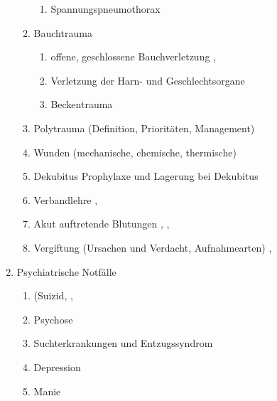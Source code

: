 \begin{WidePar}
\begin{multicols}{2}
\begin{enumerate}
\begin{enumerate}
\begin{enumerate}
        \item        Spannungspneumothorax \dotfill {}
      \end{enumerate}
      \item      Bauchtrauma
      \begin{enumerate}
        \item        offene, geschlossene Bauchverletzung \dotfill {},
        \item        Verletzung der Harn- und
        Geschlechtsorgane \dotfill {}
        \item        Beckentrauma \dotfill {}
      \end{enumerate}
      \item      Polytrauma (Definition, Prioritäten, Management) \dotfill {}
      \item      Wunden (mechanische, chemische, thermische) \dotfill {}
      \item      Dekubitus Prophylaxe und Lagerung bei Dekubitus \dotfill {}
      \item      Verbandlehre
      \dotfill
      ,
      \item      Akut auftretende Blutungen \dotfill {},
      ,
      \item      Vergiftung (Ursachen und Verdacht, Aufnahmearten) \dotfill {},
    \end{enumerate}
    \item Psychiatrische Notfälle
    \begin{enumerate}
      \item      (Suizid, \dotfill {}, 
      \item      Psychose  \dotfill {}
      \item      Suchterkrankungen und Entzugssyndrom  \dotfill {}
      \item      Depression  \dotfill {}
      \item      Manie  \dotfill {}

\end{enumerate}
\end{enumerate}
\end{multicols}
\end{WidePar}
